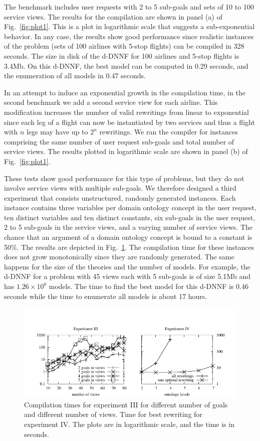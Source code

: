 \documentclass{llncs}
\begin{document}
The benchmark includes user requests with 2 to 5 sub-goals and
sets of 10 to 100 service views. The results for the compilation are
shown in panel (a) of Fig.~\ref{fig:plot1}. This is a plot in logarithmic
scale that suggests a sub-exponential behavior. In any case, the results
show good performance since realistic instances of the problem (sets of 100
airlines with 5-stop flights) can be compiled in 328 seconds.
The size in disk of the d-DNNF for 100 airlines and 5-stop flights is 3.4Mb.
On this d-DNNF, the best model can be computed in 0.29 seconds,
and the enumeration of all models in 0.47 seconds.

In an attempt to induce an exponential growth in the compilation time,
in the second benchmark we add a second service view for each airline.
This modification increases the number of valid rewritings from linear
to exponential since each leg of a flight can now be instantiated by two
services and thus a flight with $n$ legs may have up to $2^n$
rewritings.
We ran the compiler for instances comprising the same number of user request
sub-goals and total number of service views. The results plotted in
logarithmic scale are shown in panel (b) of Fig.~\ref{fig:plot1}.

These tests show good performance for this type of problems, but they do not
involve service views with multiple sub-goals. We therefore designed a
third experiment that consists unstructured, randomly generated instances.
Each instance contains three variables per domain ontology concept in the user request, ten distinct
variables and ten distinct constants, six sub-goals in the user request,
2 to 5 sub-goals in the service views, and a varying number of service views.
The chance that an argument of a domain ontology concept is bound to a constant is 50\%.
The results are depicted in Fig.~\ref{fig:plot4}.
The compilation time for these instances does not grow monotonically
since they are randomly generated. The same happens for the size of
the theories and the number of models. For example, the d-DNNF for 
a problem with 45 views each with 5 sub-goals is of size 5.1Mb and has
$1.26\times 10^8$ models. The time to find the best model for
this d-DNNF is 0.46 seconds while the time to enumerate all models
is about 17 hours.

\begin{figure}[t]
\centering
\includegraphics[width=.6\textwidth]{plots/plot4}
\caption{Compilation times for experiment III for different number of goals
and different number of views. Time for best rewriting for experiment IV. The plots are in logarithmic scale, and the time
is in seconds. }
\label{fig:plot4}
\end{figure}
\end{document}

